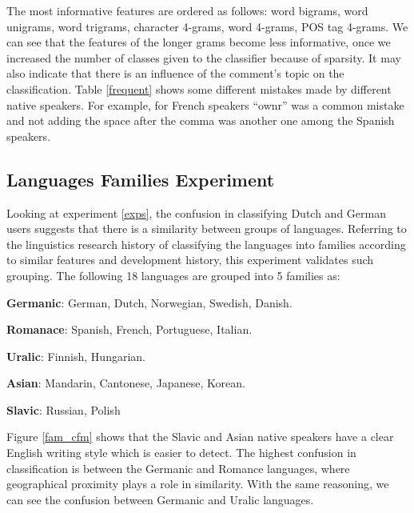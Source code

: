\documentclass[10pt,a5paper,twoside]{article}
\begin{document}
The most informative features are ordered as follows: word bigrams, word
unigrams, word trigrams, character 4-grams, word 4-grams, POS tag 4-grams.
We can see that the features of the longer grams become less informative, once we
increased the number of classes given to the classifier because of sparsity.
It may also indicate that there is an influence of the comment's topic on the
classification. Table \ref{frequent} shows some different mistakes made by
different native speakers. For example, for French speakers ``ownr'' was a common
mistake and not adding the space after the comma was another one among the Spanish speakers.

\subsection{Languages Families Experiment}

Looking at experiment \ref{exps}, the confusion in classifying Dutch and German
users suggests that there is a similarity between groups of languages. Referring
to the linguistics research history of classifying the languages into families
according to similar features and development history, this experiment validates
such grouping. The following 18 languages are grouped into 5 families as:
\begin{compactitem}
\item \textbf{Germanic}: German, Dutch, Norwegian, Swedish, Danish.
\item \textbf{Romanace}: Spanish, French, Portuguese, Italian.
\item \textbf{Uralic}: Finnish, Hungarian.
\item \textbf{Asian}: Mandarin, Cantonese, Japanese, Korean.
\item \textbf{Slavic}: Russian, Polish
\end{compactitem}

Figure \ref{fam_cfm} shows that the Slavic and Asian native speakers have a
clear English writing style which is easier to detect. The highest confusion in
classification is between the Germanic and Romance languages, where geographical
proximity plays a role in similarity. With the same reasoning, we can see the confusion between Germanic and Uralic languages.
\end{document}
